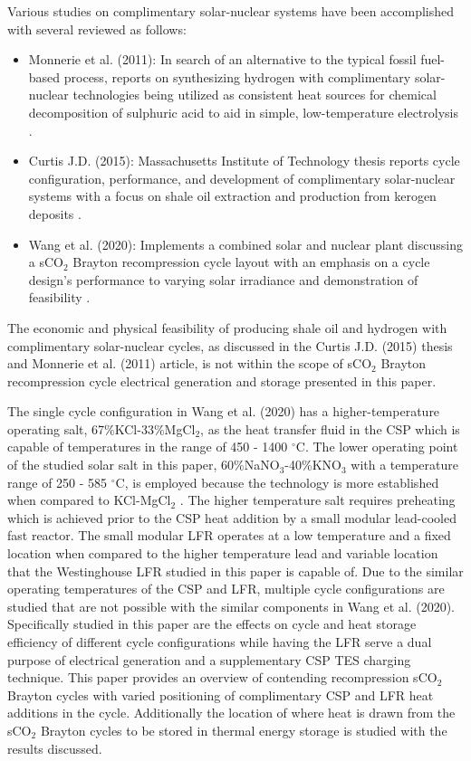 Various studies on complimentary solar-nuclear systems have been accomplished with several reviewed as follows: 

\begin{itemize}
    \item	Monnerie et al. (2011): In search of an alternative to the typical fossil fuel-based process, reports on synthesizing hydrogen with complimentary solar-nuclear technologies being utilized as consistent heat sources for chemical decomposition of sulphuric acid to aid in simple, low-temperature electrolysis \cite{monnerie_2011}. 
    \item   Curtis J.D. (2015): Massachusetts Institute of Technology thesis reports cycle configuration, performance, and development of complimentary solar-nuclear systems with a focus on shale oil extraction and production from kerogen deposits \cite{curtis_2015}. 
    \item   Wang et al. (2020): Implements a combined solar and nuclear plant discussing a sCO$_2$ Brayton recompression cycle layout with an emphasis on a cycle design's performance to varying solar irradiance and demonstration of feasibility \cite{wang_2020}. 
\end{itemize}

The economic and physical feasibility of producing shale oil and hydrogen with complimentary solar-nuclear cycles, as discussed in the Curtis J.D. (2015) thesis and Monnerie et al. (2011) article, is not within the scope of sCO$_2$ Brayton recompression cycle electrical generation and storage presented in this paper.

The single cycle configuration in Wang et al. (2020) has a higher-temperature operating salt, 67\%KCl-33\%MgCl$_2$, as the heat transfer fluid in the CSP which is capable of temperatures in the range of 450 - 1400 $^{\circ}$C. The lower operating point of the studied solar salt in this paper, 60\%NaNO$_3$-40\%KNO$_3$ with a temperature range of 250 - 585 $^{\circ}$C, is employed because the technology is more established when compared to KCl-MgCl$_2$ \cite{turchi_2018}. The higher temperature salt requires preheating which is achieved prior to the CSP heat addition by a small modular lead-cooled fast reactor. The small modular LFR operates at a low temperature and a fixed location when compared to the higher temperature lead and variable location that the Westinghouse LFR studied in this paper is capable of. Due to the similar operating temperatures of the CSP and LFR, multiple cycle configurations are studied that are not possible with the similar components in Wang et al. (2020). Specifically studied in this paper are the effects on cycle and heat storage efficiency of different cycle configurations while having the LFR serve a dual purpose of electrical generation and a supplementary CSP TES charging technique. This paper provides an overview of contending recompression sCO$_2$ Brayton cycles with varied positioning of complimentary CSP and LFR heat additions in the cycle. Additionally the location of where heat is drawn from the sCO$_2$ Brayton cycles to be stored in thermal energy storage is studied with the results discussed.



